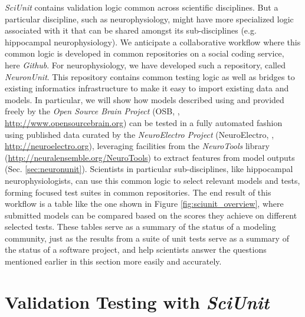 \documentclass{frontiersSCNS}
\begin{document}
\textit{SciUnit} contains validation logic common across scientific disciplines.
But a particular discipline, such as neurophysiology, might have more specialized logic associated with it that can be shared amongst its sub-disciplines (e.g. hippocampal neurophysiology). 
We anticipate a collaborative workflow where this common logic is developed in common repositories on a social coding service, here \textit{Github}. 
For neurophysiology, we have developed such a repository, called \textit{NeuronUnit}. 
This repository contains common testing logic as well as bridges to existing informatics infrastructure to make it easy to import existing data and models. 
In particular, we will show how models described using  and provided freely by the \textit{Open Source Brain Project} (OSB, \cite{gleeson_open_2012}, \url{http://www.opensourcebrain.org}) can be tested in a fully automated fashion using published data curated by the \textit{NeuroElectro Project} (NeuroElectro, \cite{tripathy_neuroelectro:_2012}, \url{http://neuroelectro.org}), leveraging facilities from the \textit{NeuroTools} library (\url{http://neuralensemble.org/NeuroTools}) to extract features from model outputs (Sec. \ref{sec:neuronunit}). 
Scientists in particular sub-disciplines, like hippocampal neurophysiologists, can use this common logic to select relevant models and tests, forming focused test suites in common repositories. 
The end result of this workflow is a table like the one shown in Figure \ref{fig:sciunit_overview}, where submitted models can be compared based on the scores they achieve on different selected tests. 
These tables serve as a summary of the status of a modeling community, just as the results from a suite of unit tests serve as a summary of the status of a software project, and help scientists answer the questions mentioned earlier in this section more easily and accurately.

\section{Validation Testing with \textit{SciUnit}}\label{sec:sciunit}
\end{document}
